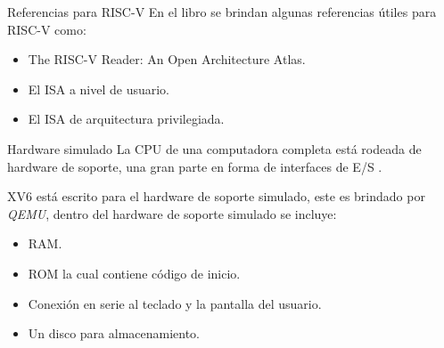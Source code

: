 \documentclass{libs/ufc_format}
\begin{document}
\begin{frame}{Referencias para RISC-V}
  En el libro \cite{xv6_book} se brindan algunas referencias útiles para RISC-V como:
  \begin{itemize}
    \item The RISC-V Reader: An Open Architecture Atlas. \cite{riscv}
    \item El ISA a nivel de usuario. \cite{riscv:user}
    \item El ISA de arquitectura privilegiada. \cite{riscv:priv}
  \end{itemize}
\end{frame}
\begin{frame}{Hardware simulado}
  La CPU de una computadora completa está rodeada de hardware de soporte, una gran parte en forma de interfaces de E/S \cite{xv6_book}.

  \vspace{0.2cm}

  XV6 está escrito para el hardware de soporte simulado, este es brindado por \emph{QEMU}, dentro del hardware de soporte simulado se incluye:
  \begin{itemize}
    \item RAM.
    \item ROM la cual contiene código de inicio.
    \item Conexión en serie al teclado y la pantalla del usuario.
    \item Un disco para almacenamiento.
  \end{itemize}
\end{frame}
\end{document}
